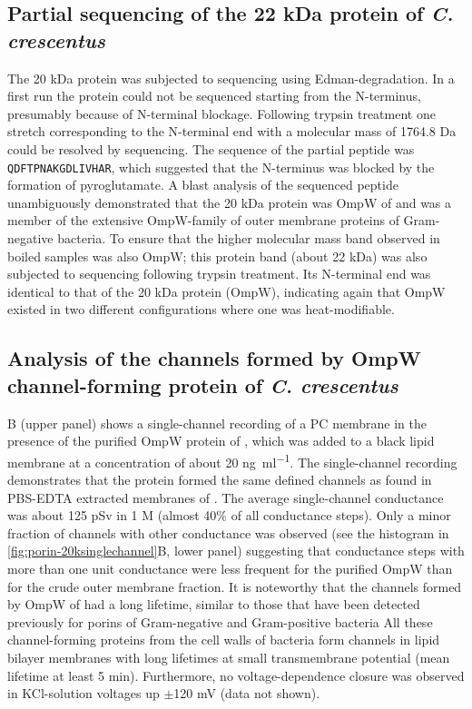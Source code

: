\subsection{Partial sequencing of the 22 kDa protein of \textit{C. crescentus}}
The 20 kDa protein was subjected to sequencing using Edman-degradation. In a first run the protein could not be sequenced starting from the N-terminus, presumably because of N-terminal blockage. Following trypsin treatment one stretch corresponding to the N-terminal end with a molecular mass of 1764.8 Da could be resolved by sequencing. The sequence of the partial peptide was \texttt{QDFTPNAKGDLIVHAR}, which suggested that the N-terminus was blocked by the formation of pyroglutamate. A \ac{blast} analysis of the sequenced peptide unambiguously demonstrated that the 20 kDa protein was OmpW of \caulobacter and was a member of the extensive OmpW-family of outer membrane proteins of Gram-negative bacteria. To ensure that the higher molecular mass band observed in boiled samples was also OmpW; this protein band (about 22 kDa) was also subjected to sequencing following trypsin treatment. Its N-terminal end was identical to that of the 20 kDa protein (OmpW), indicating again that OmpW existed in two different configurations where one was heat-modifiable. 

\subsection{Analysis of the channels formed by OmpW channel-forming protein of \textit{C. crescentus}}

B (upper panel) shows a single-channel recording of a \ac{PC} membrane in the presence of the purified OmpW protein of \caulobacter, which was added to a black lipid membrane at a concentration of about 20 \si{\nano\gram\per\milli\litre}. The single-channel recording demonstrates that the protein formed the same defined channels as found in \ac{PBS}-\ac{EDTA} extracted membranes of \caulobacter. The average single-channel conductance was about 125 \si{\pico\sievert} in 1 M  (almost 40\% of all conductance steps). Only a minor fraction of channels with other conductance was observed (see the histogram in \cref{fig:porin-20ksinglechannel}B, lower panel) suggesting that conductance steps with more than one unit conductance were less frequent for the purified OmpW than for the crude outer membrane fraction. It is noteworthy that the channels formed by OmpW of \caulobacter had a long lifetime, similar to those that have been detected previously for porins of Gram-negative and Gram-positive bacteria All these channel-forming proteins from the cell walls of bacteria form channels in lipid bilayer membranes with long lifetimes at small transmembrane potential (mean lifetime at least 5 min). Furthermore, no voltage-dependence closure was observed in KCl-solution voltages up $\pm$120 mV (data not shown). 

